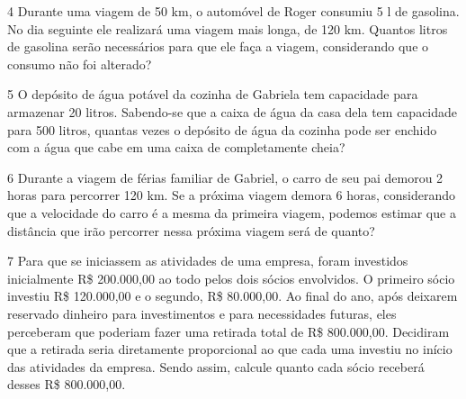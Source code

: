 \num{4} Durante uma viagem de 50 km, o automóvel de Roger consumiu 5 l de
gasolina. No dia seguinte ele realizará uma viagem mais longa, de 120 km.
Quantos litros de gasolina serão necessários para que ele faça a viagem,
considerando que o consumo não foi alterado?

\bigskip\bigskip

\num{5} O depósito de água potável da cozinha de Gabriela tem capacidade
para armazenar 20 litros. Sabendo-se que a caixa de água da casa dela tem capacidade para 500 litros, quantas vezes o depósito de
água da cozinha pode ser enchido com a água que cabe em uma caixa de completamente cheia?

\bigskip\bigskip

\num{6} Durante a viagem de férias familiar de Gabriel, o carro de seu pai
demorou 2 horas para percorrer 120 km. Se a próxima viagem demora 6
horas, considerando que a velocidade do carro é a mesma da primeira
viagem, podemos estimar que a distância que irão percorrer nessa próxima viagem será de quanto?


\pagebreak
\num{7} Para que se iniciassem as atividades de uma empresa, foram investidos
inicialmente R\$ 200.000,00 ao todo pelos dois sócios envolvidos. O primeiro
sócio investiu R\$ 120.000,00 e o segundo, R\$ 80.000,00. Ao final do ano,
após deixarem reservado dinheiro para investimentos e para necessidades
futuras, eles perceberam que poderiam fazer uma retirada total de R\$ 800.000,00. Decidiram que a retirada seria diretamente proporcional ao que
cada uma investiu no início das atividades da empresa. Sendo assim,
calcule quanto cada sócio receberá desses R\$ 800.000,00.


